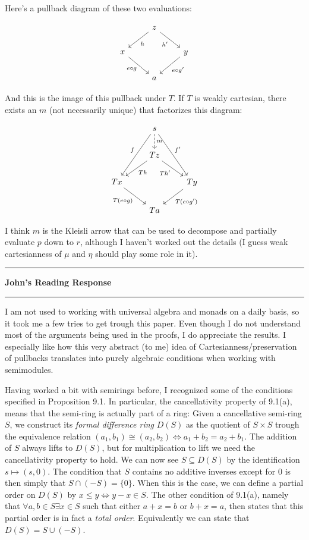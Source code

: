 \documentclass{amsart}
\newcommand{\iam}[1]{
  \vspace{0.25em}
  \hrule
  \vspace{0.25em}
  \textbf{{#1}'s Reading Response}
  \vspace{0.25em}
  \hrule
  \vspace{1em}
}
\begin{document}
Here's a pullback diagram of these two evaluations:



\begin{equation*}
\begin{tikzcd}
& z
\arrow[ld, "h"]
\arrow[rd, "h'"']\\
x
\arrow[rd, "e \circ g"']
&& y
\arrow[ld, "e \circ g'"] \\
& a
\end{tikzcd}
\end{equation*}

And this is the image of this pullback under $T$. If $T$ is weakly cartesian, there exists an $m$ (not necessarily unique) that factorizes this diagram:


\begin{equation*}
\begin{tikzcd}
& s
\arrow[ldd, "f"']
\arrow[d, dashed, "m"]
\arrow[rdd, "f'"] \\
& Tz
\arrow[ld, "Th"]
\arrow[rd, "Th'"']\\
Tx
\arrow[rd, "T(e \circ g)"']
&& Ty
\arrow[ld, "T (e \circ g')"] \\
& Ta
\end{tikzcd}
\end{equation*}

I think $m$ is the Kleisli arrow that can be used to decompose and partially evaluate $p$ down to $r$, although I haven't worked out the details (I guess weak cartesianness of $\mu$ and $\eta$ should play some role in it).



\iam{John}

I am not used to working with universal algebra and monads on a daily basis, so it took me a few tries to get trough this paper. Even though I do not understand most of the arguments being used in the proofs, I do appreciate the results. I especially like how this very abstract (to me) idea of Cartesianness/preservation of pullbacks translates into purely algebraic conditions when working with semimodules.

Having worked a bit with semirings before, I recognized some of the conditions specified in Proposition 9.1. In particular, the cancellativity property of 9.1(a), means that the semi-ring is actually part of a ring: Given a cancellative semi-ring $S$, we construct its \emph{formal difference ring} $D(S)$ as the quotient of $S\times S$ trough the equivalence relation $(a_1,b_1)\cong (a_2,b_2) \iff a_1+b_2 = a_2+b_1$. The addition of $S$ always lifts to $D(S)$, but for multiplication to lift we need the cancellativity property to hold. We can now see $S\subseteq D(S)$ by the identification $s\mapsto (s,0)$. The condition that $S$ contains no additive inverses except for $0$ is then simply that $S\cap (-S) = \{0\}$. When this is the case, we can define a partial order on $D(S)$ by $x\leq y \iff y-x \in S$. The other condition of 9.1(a), namely that $\forall a,b\in S \exists x\in S$ such that either $a+x=b$ or $b+x = a$, then states that this partial order is in fact a \emph{total order}. Equivalently we can state that $D(S) = S\cup (-S)$.
\end{document}
